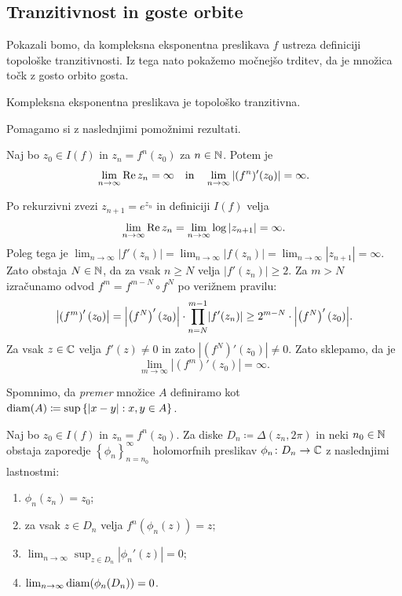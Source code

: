 \subsection{Tranzitivnost in goste orbite} \label{sec:transitivity}

Pokazali bomo, da kompleksna eksponentna preslikava \(f\) ustreza definiciji topološke tranzitivnosti. Iz tega nato pokažemo močnejšo trditev, da je množica točk z gosto orbito gosta.

\begin{izrek} \label{thm:transitivity}
    Kompleksna eksponentna preslikava je topološko tranzitivna.
\end{izrek}

\noindent Pomagamo si z naslednjimi pomožnimi rezultati.

\begin{trditev}
    Naj bo \(z_0 \in I (f)\) in \(z_n = f^n (z_0)\) za \(n \in \mathbb N\). Potem je
    \[\lim_{n \to \infty} \operatorname{Re} z_n = \infty \quad \text{in} \quad \lim_{n \to \infty} |(f^n)' (z_0)| = \infty.\]
\end{trditev}

\begin{dokaz}
    Po rekurzivni zvezi \(z_{n + 1} = e^{z_n}\) in definiciji \(I (f)\) velja
    \[\lim_{n \to \infty} \operatorname{Re} z_n = \lim_{n \to \infty} \log |z_{n + 1}| = \infty.\]
    Poleg tega je \(\lim_{n \to \infty} |f' (z_n)| = \lim_{n \to \infty} |f (z_n)| = \lim_{n \to \infty} |z_{n + 1}| = \infty\). Zato obstaja \(N \in \mathbb N\), da za vsak \(n \geq N\) velja \(|f' (z_n)| \geq 2\). Za \(m > N\) izračunamo odvod \(f^{m} = f^{m - N} \circ f^{N}\) po verižnem pravilu:
    \[\abs{\prt{f^{m}}' (z_0)} = \abs{ \prt{f^{N}}' (z_0) } \cdot \prod_{n = N}^{m - 1} \abs{f' (z_n)} \geq 2^{m - N} \cdot \abs{ \prt{f^{N}}' (z_0) }.\]
    Za vsak \(z \in \mathbb C\) velja \(f' (z) \neq 0\) in zato \(|(f^N)' (z_0)| \neq 0\). Zato sklepamo, da je
    \[\lim_{m \to \infty} |(f^{m})' (z_0)| = \infty.\]
\end{dokaz}

\noindent Spomnimo, da \emph{premer} množice \(A\) definiramo kot \(\operatorname{diam} (A) \coloneq \sup \left\{ |x - y| : x, y \in A \right\}\).

\begin{trditev} \label{prop:small_disks}
    Naj bo \(z_0 \in I (f)\) in \(z_n = f^{n} (z_0)\). Za diske \(D_n \coloneq \Delta (z_n, 2 \pi)\) in neki \(n_0 \in \mathbb N\) obstaja zaporedje \(\left\{ \phi_n \right\}_{n = n_0}^{\infty}\) holomorfnih preslikav \(\phi_n \colon D_n \to \mathbb C\) z naslednjimi lastnostmi:
    \begin{enumerate}
        \item \label{item:ena} \(\phi_n (z_n) = z_0\);
        \item \label{item:dva} za vsak \(z \in D_n\) velja \(f^n (\phi_n (z)) = z\);
        \item \label{item:tri} \(\lim_{n \to \infty} \sup_{z \in D_n} |\phi_n' (z)| = 0\);
        \item \label{item:stiri} \(\lim_{n \to \infty} \operatorname{diam} (\phi_n (D_n)) = 0\).
    \end{enumerate}
\end{trditev}

